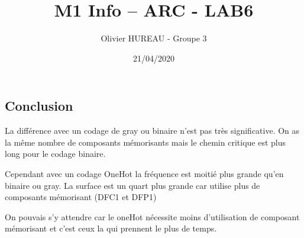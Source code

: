 \documentclass{article}
\title{M1 Info – ARC - LAB6}
\author{Olivier HUREAU - Groupe 3}
\date{21/04/2020}
\newcommand{\sautligne}{
\textbf{\vspace{5mm}}
}
\begin{document}
\maketitle
\renewcommand{\contentsname}{Table des matières}
\tableofcontents
\newpage


\newpage
\subsection{Conclusion}
La différence avec un codage de gray ou binaire n'est pas très significative. On as la même nombre de composants mémorisants mais le chemin critique est plus long pour le codage binaire.
\sautligne

Cependant avec un codage OneHot la fréquence est moitié plus grande qu'en binaire ou gray. La surface est un quart plus grande car utilise plus de composants mémorisant (DFC1 et DFP1)
\sautligne

On pouvais s'y attendre car le oneHot nécessite moins d'utilisation de composant mémorisant et c'est ceux la qui prennent le plus de temps.
\end{document}
